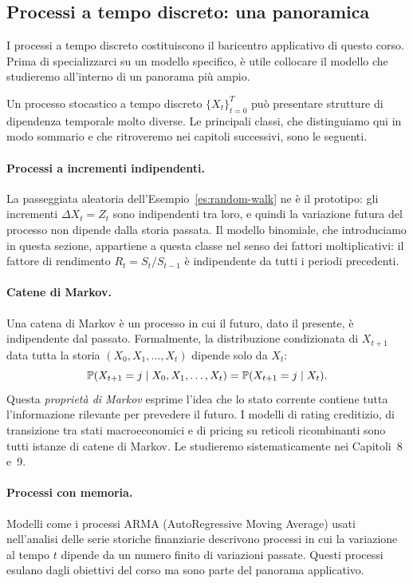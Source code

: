 \subsection{Processi a tempo discreto: una panoramica}

\noindent
I processi a tempo discreto costituiscono il baricentro applicativo
di questo corso. Prima di specializzarci su un modello specifico,
\`{e} utile collocare il modello che studieremo all'interno di un
panorama pi\`{u} ampio.

Un processo stocastico a tempo discreto $\{X_t\}_{t=0}^{T}$ pu\`{o}
presentare strutture di dipendenza temporale molto diverse. Le
principali classi, che distinguiamo qui in modo sommario e che
ritroveremo nei capitoli successivi, sono le seguenti.

\paragraph{Processi a incrementi indipendenti.}
La passeggiata aleatoria dell'Esempio~\ref{es:random-walk} ne \`{e}
il prototipo: gli incrementi $\Delta X_t=Z_t$ sono indipendenti tra
loro, e quindi la variazione futura del processo non dipende dalla
storia passata. Il modello binomiale, che introduciamo in questa
sezione, appartiene a questa classe nel senso dei fattori
moltiplicativi: il fattore di rendimento $R_t=S_t/S_{t-1}$ \`{e}
indipendente da tutti i periodi precedenti.

\paragraph{Catene di Markov.}
Una catena di Markov \`{e} un processo in cui il futuro, dato il
presente, \`{e} indipendente dal passato. Formalmente, la distribuzione
condizionata di $X_{t+1}$ data tutta la storia
$(X_0,X_1,\ldots,X_t)$ dipende solo da $X_t$:
\[
\mathbb{P}(X_{t+1}=j\mid X_0,X_1,\ldots,X_t)=\mathbb{P}(X_{t+1}=j\mid X_t).
\]
Questa \emph{propriet\`{a} di Markov} esprime l'idea che lo stato
corrente contiene tutta l'informazione rilevante per prevedere il
futuro. I modelli di rating creditizio, di transizione tra stati
macroeconomici e di pricing su reticoli ricombinanti sono tutti
istanze di catene di Markov. Le studieremo sistematicamente nei
Capitoli~8 e~9.

\paragraph{Processi con memoria.}
Modelli come i processi ARMA (AutoRegressive Moving Average) usati
nell'analisi delle serie storiche finanziarie descrivono processi in
cui la variazione al tempo $t$ dipende da un numero finito di
variazioni passate. Questi processi esulano dagli obiettivi del corso
ma sono parte del panorama applicativo.

